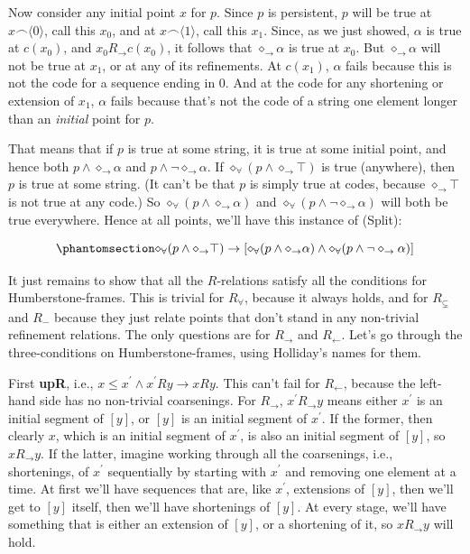 \documentclass[
  11pt,
  letterpaper,
  DIV=11,
  numbers=noendperiod,
  twoside]{scrartcl}
\begin{document}
Now consider any initial point \(x\) for \(p\). Since \(p\) is
persistent, \(p\) will be true at \(x\frown \langle0\rangle\), call this
\(x_0\), and at \(x\frown \langle1\rangle\), call this \(x_1\). Since,
as we just showed, \(\alpha\) is true at \(c(x_0)\), and
\(x_0R_{\rightarrow}c(x_0)\), it follows that
\(\diamond_{\rightarrow} \alpha\) is true at \(x_0\). But
\(\diamond_{\rightarrow} \alpha\) will not be true at \(x_1\), or at any
of its refinements. At \(c(x_1)\), \(\alpha\) fails because this is not
the code for a sequence ending in 0. And at the code for any shortening
or extension of \(x_1\), \(\alpha\) fails because that's not the code of
a string one element longer than an \emph{initial} point for \(p\).

That means that if \(p\) is true at some string, it is true at some
initial point, and hence both \(p \wedge \diamond_{\rightarrow} \alpha\)
and \(p \wedge \neg \diamond_{\rightarrow} \alpha\). If
\(\diamond_{\forall}(p \wedge \diamond_{\rightarrow} \top)\) is true
(anywhere), then \(p\) is true at some string. (It can't be that \(p\)
is simply true at codes, because \(\diamond_{\rightarrow} \top\) is not
true at any code.) So
\(\diamond_{\forall}(p \wedge \diamond_{\rightarrow} \alpha)\) and
\(\diamond_{\forall}(p \wedge \neg \diamond_{\rightarrow} \alpha)\) will
both be true everywhere. Hence at all points, we'll have this instance
of (Split):

\begin{equation}\protect\phantomsection\label{eq-split}{
\diamond_{\forall}(p \wedge \diamond_{\rightarrow} \top) \rightarrow [\diamond_{\forall}(p \wedge \diamond_{\rightarrow} \alpha) \wedge \diamond_{\forall}(p \wedge \neg \diamond_{\rightarrow} \alpha)] 
}\end{equation}

It just remains to show that all the \(R\)-relations satisfy all the
conditions for Humberstone-frames. This is trivial for \(R_\forall\),
because it always holds, and for \(R_{\subsetneq}\) and \(R_{-}\)
because they just relate points that don't stand in any non-trivial
refinement relations. The only questions are for \(R_{\rightarrow}\) and
\(R_{\leftarrow}\). Let's go through the three-conditions on
Humberstone-frames, using Holliday's names for them.

First \textbf{upR}, i.e.,
\(x \leq x^{\prime} \wedge x^{\prime}Ry \rightarrow xRy\). This can't
fail for \(R_{\leftarrow}\), because the left-hand side has no
non-trivial coarsenings. For \(R_{\rightarrow}\),
\(x^{\prime}R_{\rightarrow}y\) means either \(x^\prime\) is an initial
segment of \([y]\), or \([y]\) is an initial segment of \(x^\prime\). If
the former, then clearly \(x\), which is an initial segment of
\(x^\prime\), is also an initial segment of \([y]\), so
\(xR_{\rightarrow}y\). If the latter, imagine working through all the
coarsenings, i.e., shortenings, of \(x^\prime\) sequentially by starting
with \(x^\prime\) and removing one element at a time. At first we'll
have sequences that are, like \(x^\prime\), extensions of \([y]\), then
we'll get to \([y]\) itself, then we'll have shortenings of \([y]\). At
every stage, we'll have something that is either an extension of
\([y]\), or a shortening of it, so \(xR_{\rightarrow}y\) will hold.
\end{document}

